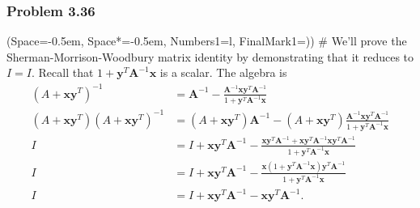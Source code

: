 \documentclass[12pt, a4paper]{article}
\newcommand{\listSpace}{-0.5em}%
\newcommand{\vect}[1]{\bm{#1}}
\begin{document}
\subsubsection*{Problem 3.36}
\begin{easylist}[enumerate]
\ListProperties(Space=\listSpace, Space*=\listSpace, Numbers1=l, FinalMark1={)})
# We'll prove the Sherman-Morrison-Woodbury matrix identity by demonstrating that it reduces to $I = I$.
Recall that $1 + \vect{y}^T \vect{A}^{-1} \vect{x}$ is a scalar.
The algebra is
\begin{align*}
\left(A + \vect{x}\vect{y}^T\right)^{-1} &= \vect{A}^{-1} - \frac{\vect{A}^{-1}\vect{x}\vect{y}^T\vect{A}^{-1}}{1 + \vect{y}^T \vect{A}^{-1} \vect{x}} \\
\left(A + \vect{x}\vect{y}^T\right)\left(A + \vect{x}\vect{y}^T\right)^{-1} &= \left(A + \vect{x}\vect{y}^T\right)\vect{A}^{-1} - \left(A + \vect{x}\vect{y}^T\right)\frac{\vect{A}^{-1}\vect{x}\vect{y}^T\vect{A}^{-1}}{1 + \vect{y}^T \vect{A}^{-1} \vect{x}} \\
I &= I + \vect{x} \vect{y}^T \vect{A}^{-1} - \frac{\vect{x}\vect{y}^T \vect{A}^{-1} + \vect{x}\vect{y}^T \vect{A}^{-1} \vect{x}\vect{y}^T \vect{A}^{-1}}{1 + \vect{y}^T \vect{A}^{-1} \vect{x}} \\
I &= I + \vect{x} \vect{y}^T \vect{A}^{-1} - \frac{ \vect{x} \left( 1 + \vect{y}^T \vect{A}^{-1} \vect{x} \right) \vect{y}^T \vect{A}^{-1}}{1 + \vect{y}^T \vect{A}^{-1} \vect{x}} \\
I &= I + \vect{x} \vect{y}^T \vect{A}^{-1} - \vect{x} \vect{y}^T \vect{A}^{-1} .
\end{align*}


\end{easylist}
\end{document}
